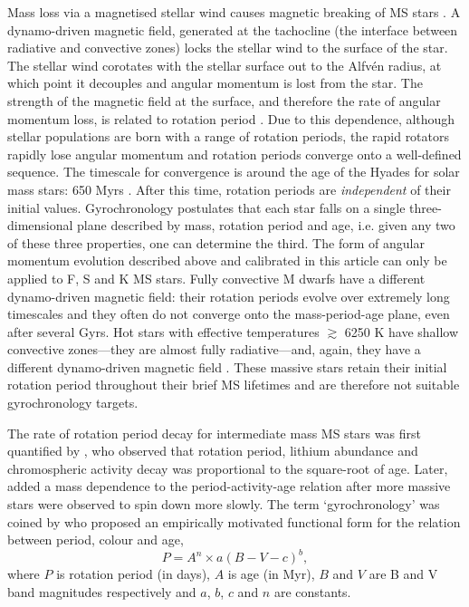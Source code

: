 \documentclass[11pt,preprint]{aastex}
\begin{document}
Mass loss via a magnetised stellar wind causes magnetic breaking of MS stars
\citep{Weber1967}.
A dynamo-driven magnetic field, generated at the tachocline (the interface
between radiative and convective zones) locks the stellar wind to the surface
of the star.
The stellar wind corotates with the stellar surface out to the Alfv\'{e}n
radius, at which point it decouples and angular momentum is lost from the
star.
The strength of the magnetic field at the surface, and therefore the rate of
angular momentum loss, is related to rotation period \citep{Kawaler1988}.
Due to this dependence, although stellar populations are born with a range of
rotation periods, the rapid rotators rapidly lose angular momentum and
rotation periods converge onto a well-defined sequence.
The timescale for convergence is around the age of the Hyades for solar mass
stars: 650 Myrs \citep{Radick1987, Irwin2009}.
After this time, rotation periods are \emph{independent} of their initial
values.
Gyrochronology postulates that each star falls on a single three-dimensional
plane described by mass, rotation period and age, i.e. given any two of these
three properties, one can determine the third.
The form of angular momentum evolution described above and calibrated in this
article can only be applied to F, S and K MS stars.
Fully convective M dwarfs have a different dynamo-driven magnetic field: their
rotation periods evolve over extremely long timescales and they often do not
converge onto the mass-period-age plane, even after several Gyrs.
Hot stars with effective temperatures $\gtrsim$ 6250 K have shallow convective
zones---they are almost fully radiative---and, again, they have a different
dynamo-driven magnetic field \citep{Kraft1967}.
These massive stars retain their initial rotation period throughout their
brief MS lifetimes and are therefore not suitable gyrochronology targets.

The rate of rotation period decay for intermediate mass MS stars was first
quantified by \citet{Skumanich1972}, who observed that rotation period,
lithium abundance and chromospheric activity decay was proportional to the
square-root of age.
Later, \citet{Noyes1984_2} added a mass dependence to the period-activity-age
relation after more massive stars were observed to spin down more slowly.
The term `gyrochronology' was coined by \citet{Barnes2003} who proposed an
empirically motivated functional form for the relation between period, colour
and age, \begin{equation} \label{eq:Barnes2007_2} P = A^n \times a(B-V-c)^b,
\end{equation} where $P$ is rotation period (in days), $A$ is age (in Myr),
$B$ and $V$ are B and V band magnitudes respectively and $a$, $b$, $c$ and $n$
are constants.
\end{document}
